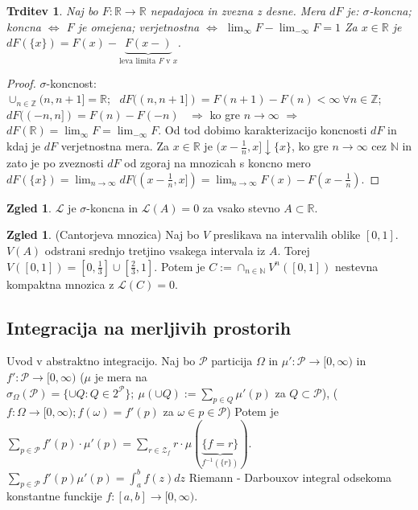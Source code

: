 \documentclass[a4paper,12pt]{article}
\theoremstyle{definition} %
\newtheorem{zgled}[definicija]{Zgled}
\theoremstyle{plain} %
\newtheorem{trditev}[definicija]{Trditev}
\newcommand{\R}{\mathbb{R}}
\newcommand{\N}{\mathbb{N}}
\begin{document}
            \begin{trditev}
                Naj bo $F:\R \rightarrow \R$ nepadajoca in zvezna z desne. Mera $dF$ je: $\sigma$-koncna; koncna $\iff$ $F$ je omejena;
                verjetnostna $\iff$ $\lim_{\infty}F - \lim_{-\infty}F = 1$ Za $x \in \R$ je $dF(\{x\}) = F(x) - \underbrace{F(x-)}_{\text{leva limita $F$ v $x$}}$. 

            \end{trditev}
            \begin{proof}
                $\sigma$-koncnost: \\
                $\cup_{n \in \mathbb{Z}}(n, n+1]=\R$; \ 
                $dF((n, n+1]) = F(n + 1) - F(n) < \infty \ \forall n \in \mathbb{Z}$; \ $dF((-n, n]) = F(n) - F(-n)$ \ $\Rightarrow$ ko gre $n \rightarrow \infty$ $\Rightarrow$ $dF(\R) = \lim_\infty F = \lim_{-\infty}F$.
                Od tod dobimo karakterizacijo koncnosti $dF$ in kdaj je $dF$ verjetnostna mera.
                Za $x \in \R$ je $(x - \frac{1}{n}, x] \downarrow \{x\}$, ko gre $n \rightarrow \infty$ cez $\N$ in zato je po zveznosti
                $dF$ od zgoraj na mnozicah s koncno mero $dF(\{x\}) = \lim_{n \rightarrow \infty}dF((x - \frac{1}{n}, x]) = \lim_{n \rightarrow \infty}F(x) - F(x - \frac{1}{n})$.
            \end{proof}

            \begin{zgled}
                $\mathcal{L}$ je $\sigma$-koncna in $\mathcal{L}(A) = 0$ za vsako stevno $A\subset\R$.
            \end{zgled}

            \begin{zgled}(Cantorjeva mnozica)
                Naj bo $V$ preslikava na intervalih oblike $[0, 1]$. $V(A)$ odstrani srednjo tretjino vsakega intervala iz $A$.
                Torej $V([0, 1]) = [0, \frac{1}{3}] \cup [\frac{2}{3}, 1]$. Potem je $C:= \cap_{n\in\N}V^n([0, 1])$ nestevna kompaktna 
                mnozica z $\mathcal{L}(C) = 0$.
            \end{zgled}

    \subsection{Integracija na merljivih prostorih}
            Uvod v abstraktno integracijo.
            Naj bo $\mathcal{P}$ particija $\Omega$ in $\mu':\mathcal{P} \rightarrow [0, \infty)$ in
            $f':\mathcal{P} \rightarrow [0, \infty)$ ($\mu$ je mera na $\sigma_\Omega(\mathcal{P})=\{\cup Q: Q \in 2^{\mathcal{P}}\}; \ 
            \mu(\cup Q):= \sum_{p \in Q}\mu'(p)$ za $Q \subset \mathcal{P}$), ($f:\Omega \rightarrow [0, \infty); f(\omega) = f'(p)$ za $\omega \in p \in \mathcal{P}$)
            Potem je $\sum_{p \in \mathcal{P}}f'(p)\cdot\mu'(p) = \sum_{r \in \mathcal{Z}_f}r\cdot\mu(\underbrace{\{f = r\}}_{f^{-1}(\{r\})})$.
            $\sum_{p \in \mathcal{P}}f'(p)\mu'(p) = \int_a^bf(z)dz$ Riemann - Darbouxov integral odsekoma konstantne funckije 
            $f: [a, b] \rightarrow [0, \infty)$.
\end{document}

